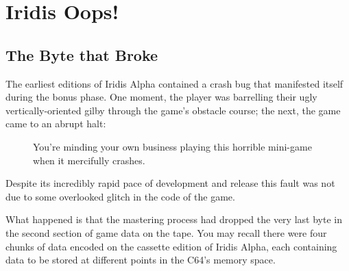 \chapter{Iridis Oops!} 
\label{sec:bugs}
\lstset{style=6502Style}

\section{The Byte that Broke}
The earliest editions of Iridis Alpha contained a crash bug that manifested itself
during the bonus phase. One moment, the player was barrelling their ugly vertically-oriented
gilby through the game's obstacle course; the next, the game came to an abrupt halt:

\begin{figure}[H]
    \centering
    \hspace{0.5cm}
\caption{You're minding your own business playing this horrible mini-game when it mercifully crashes.}
\end{figure}

Despite its incredibly rapid pace of development and release this fault was not due
to some overlooked glitch in the code of the game.

What happened is that the mastering process had dropped the very last byte in the second
section of game data on the tape. You may recall there were four chunks of data encoded on
the cassette edition of Iridis Alpha, each containing data to be stored at different points
in the C64's memory space.

